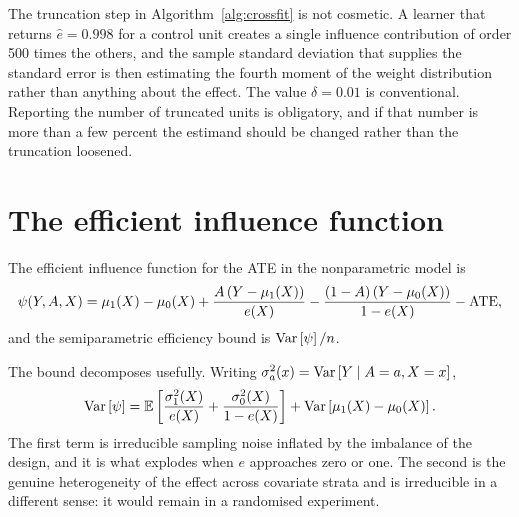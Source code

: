 The truncation step in Algorithm~\ref{alg:crossfit} is not cosmetic. A learner
that returns $\hat{e} = 0.998$ for a control unit creates a single influence
contribution of order 500 times the others, and the sample standard deviation
that supplies the standard error is then estimating the fourth moment of the
weight distribution rather than anything about the effect. The value
$\delta = 0.01$ is conventional. Reporting the number of truncated units is
obligatory, and if that number is more than a few percent the estimand should be
changed rather than the truncation loosened.

\section{The efficient influence function}
\label{sec:dr-influence}

\begin{proposition}
\label{prop:eif}
The efficient influence function for the ATE in the nonparametric model is
\begin{equation}
  \psi(Y, A, X) = \mu_1(X) - \mu_0(X)
    + \frac{A\left( Y - \mu_1(X) \right)}{e(X)}
    - \frac{(1-A)\left( Y - \mu_0(X) \right)}{1 - e(X)}
    - \mathrm{ATE},
  \label{eq:influence}
\end{equation}
and the semiparametric efficiency bound is $\mathrm{Var}\left[ \psi \right] / n$.
\end{proposition}

The bound decomposes usefully. Writing $\sigma_a^{2}(x) = \mathrm{Var}\left[ Y \mid A = a, X = x \right]$,
\begin{equation}
  \mathrm{Var}\left[ \psi \right]
    = \mathbb{E}\left[ \frac{\sigma_1^{2}(X)}{e(X)} + \frac{\sigma_0^{2}(X)}{1 - e(X)} \right]
    + \mathrm{Var}\left[ \mu_1(X) - \mu_0(X) \right].
  \label{eq:efficiency-bound}
\end{equation}
The first term is irreducible sampling noise inflated by the imbalance of the
design, and it is what explodes when $e$ approaches zero or one. The second is
the genuine heterogeneity of the effect across covariate strata and is
irreducible in a different sense: it would remain in a randomised experiment.

